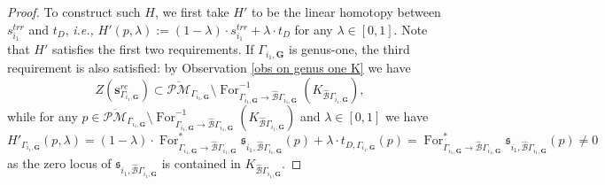 \documentclass[11pt]{amsart}
\theoremstyle{definition}
\theoremstyle{remark}
\newcommand{\oPMb}{{\overline{\mathcal{PM}}}}
\newcommand{\<}{\left<}
\renewcommand{\>}{\right>}
\numberwithin{equation}{section}
\begin{document}
\begin{proof}
        To construct such $H$, we first take $H'$ to be the linear homotopy between $s^{trr}_{i_1}$ and $t_D$, \textit{i.e.,} $H'(p,\lambda):=(1-\lambda)\cdot s^{trr}_{i_1}+\lambda \cdot t_D$ for any $\lambda\in [0,1]$. Note that $H'$ satisfies the first two requirements. If $\Gamma_{i_1,\bm{G}}$ is genus-one, the third requirement is also satisfied: by Observation \ref{obs on genus one K} we have 
        $$Z\left(\bm{s}^{re}_{\Gamma_{i_1,\bm{G}}}\right)\subset \oPMb_{\Gamma_{i_1,\bm{G}}}\setminus \operatorname{For}^{-1}_{\Gamma_{i_1,\bm{G}} \to \hat{\mathcal B}\Gamma_{i_1,\bm{G}}} \left(K_{\hat{\mathcal B}\Gamma_{i_1,\bm{G}}}\right),$$
        while for any $p\in \oPMb_{\Gamma_{i_1,\bm{G}}}\setminus \operatorname{For}^{-1}_{\Gamma_{i_1,\bm{G}} \to \hat{\mathcal B}\Gamma_{i_1,\bm{G}}} \left(K_{\hat{\mathcal B}\Gamma_{i_1,\bm{G}}}\right)$ and $\lambda\in [0,1]$ we have $$H'_{\Gamma_{i_1,\bm{G}}}(p,\lambda)=(1-\lambda)\cdot \operatorname{For}^*_{\Gamma_{i_1,\bm{G}} \to \hat{\mathcal B}\Gamma_{i_1,\bm{G}}} \mathfrak s_{i_1,\hat{\mathcal B}\Gamma_{i_1,\bm{G}}}(p) +\lambda \cdot t_{D,\Gamma_{i_1,\bm{G}}}(p)=\operatorname{For}^*_{\Gamma_{i_1,\bm{G}} \to \hat{\mathcal B}\Gamma_{i_1,\bm{G}}} \mathfrak s_{i_1,\hat{\mathcal B}\Gamma_{i_1,\bm{G}}}(p)\ne 0$$
        as the zero locus of $\mathfrak s_{i_1,\hat{\mathcal B}\Gamma_{i_1,\bm{G}}}$ is contained in $K_{\hat{\mathcal B}\Gamma_{i_1,\bm{G}}}$.


\end{proof}
\end{document}
